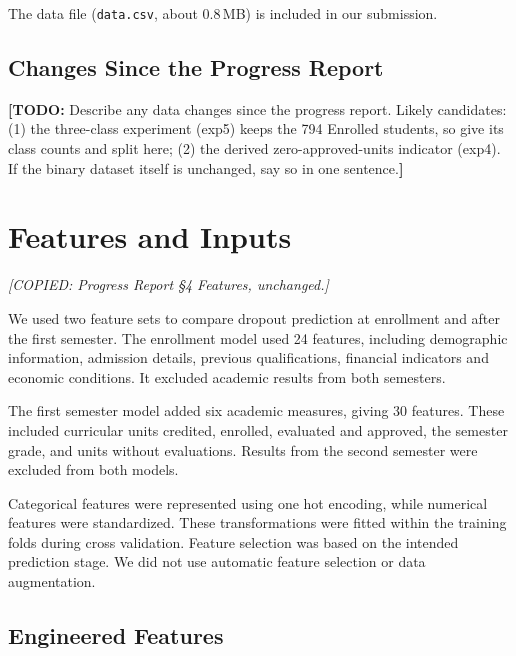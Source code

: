 \documentclass[11pt]{article}
\newcommand{\todo}[1]{{\color{red}\textbf{[TODO:} #1\textbf{]}}}
\newcommand{\copynote}[1]{{\color{blue}\textit{[COPIED: #1]}}}
\newcommand{\todo}[1]{}
\newcommand{\copynote}[1]{}
\begin{document}
The data file (\texttt{data.csv}, about 0.8\,MB) is included in our submission.

\subsection{Changes Since the Progress Report}

\todo{Describe any data changes since the progress report. Likely candidates: (1) the three-class experiment (exp5) keeps the 794 Enrolled students, so give its class counts and split here; (2) the derived zero-approved-units indicator (exp4). If the binary dataset itself is unchanged, say so in one sentence.}

\section{Features and Inputs}\label{sec:features}
\copynote{Progress Report \S4 Features, unchanged.}

We used two feature sets to compare dropout prediction at enrollment and after the first semester. The enrollment model used 24 features, including demographic information, admission details, previous qualifications, financial indicators and economic conditions. It excluded academic results from both semesters.

The first semester model added six academic measures, giving 30 features. These included curricular units credited, enrolled, evaluated and approved, the semester grade, and units without evaluations. Results from the second semester were excluded from both models.

Categorical features were represented using one hot encoding, while numerical features were standardized. These transformations were fitted within the training folds during cross validation. Feature selection was based on the intended prediction stage. We did not use automatic feature selection or data augmentation.

\subsection{Engineered Features}
\end{document}
